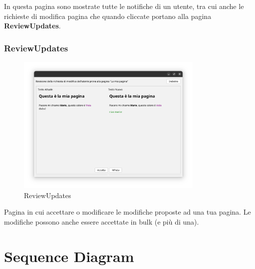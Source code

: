 \documentclass{article}
\begin{document}
	In questa pagina sono mostrate tutte le notifiche di un utente, tra cui anche le richieste di modifica pagina che quando cliccate portano alla pagina \textbf{ReviewUpdates}.
	
	\newpage
	
	\subsubsection{ReviewUpdates}
	\begin{figure}[htbp]
		\centering
		\includegraphics[width=0.8\textwidth,height=0.8\textheight,keepaspectratio]{review_updates.png}
		\caption{ReviewUpdates}
		\label{fig:9}
	\end{figure}
	
	Pagina in cui accettare o modificare le modifiche proposte ad una tua pagina. Le modifiche possono anche essere accettate in bulk (e pi\`u di una).	
	
	\newpage
	
	\section{Sequence Diagram}
	
\end{document}
